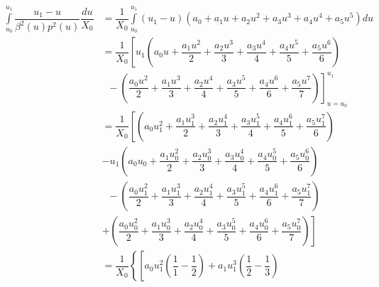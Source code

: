 \documentclass[a4paper,landscape]{article}
\begin{document}
\begin{align*}
    \int\limits_{u_0}^{u_1} \dfrac{u_1-u}{\beta^2(u) p^2(u)}\dfrac{du}{X_0} &= \dfrac{1}{X_0}\int\limits_{u_0}^{u_1}\left(u_1-u\right)\left(a_0 +a_1u + a_2u^2+a_3u^3+a_4u^4+a_5u^5\right)du\\
    &= \dfrac{1}{X_0}
    \left[
        u_1
        \left(
            a_0u + \dfrac{a_1u^2}{2} + \dfrac{a_2u^3}{3} + \dfrac{a_3u^4}{4} + \dfrac{a_4u^5}{5} + \dfrac{a_5u^6}{6}
        \right)
    \right.
    \\
    &
    \left.
        \;\; -
        \left(
            \dfrac{a_0u^2}{2} + \dfrac{a_1u^3}{3} + \dfrac{a_2u^4}{4} + \dfrac{a_3u^5}{5} + \dfrac{a_4u^6}{6} + \dfrac{a_5u^7}{7}
        \right)
    \right]_{u=u_0}^{u_1}
    \\
    &= \dfrac{1}{X_0}
    \left[
        \left(
            a_0u_1^2 + \dfrac{a_1u_1^3}{2} + \dfrac{a_2u_1^4}{3} + \dfrac{a_3u_1^5}{4} + \dfrac{a_4u_1^6}{5} + \dfrac{a_5u_1^7}{6}
        \right)
    \right.
    \\
    &
        -
        u_1
        \left(
            a_0u_0 + \dfrac{a_1u_0^2}{2} + \dfrac{a_2u_0^3}{3} + \dfrac{a_3u_0^4}{4} + \dfrac{a_4u_0^5}{5} + \dfrac{a_5u_0^6}{6}
        \right)
    \\
    &\;\;
        -
        \left(
            \dfrac{a_0u_1^2}{2} + \dfrac{a_1u_1^3}{3} + \dfrac{a_2u_1^4}{4} + \dfrac{a_3u_1^5}{5} + \dfrac{a_4u_1^6}{6} + \dfrac{a_5u_1^7}{7}
        \right)
    \\
    &
    \left.
    +
        \left(
            \dfrac{a_0u_0^2}{2} + \dfrac{a_1u_0^3}{3} + \dfrac{a_2u_0^4}{4} + \dfrac{a_3u_0^5}{5} + \dfrac{a_4u_0^6}{6} + \dfrac{a_5u_0^7}{7}
        \right)
    \right]
    \\
    &= \dfrac{1}{X_0}
    \left\{
        \left[
              a_0u_1^2\left(\dfrac{1}{1}- \dfrac{1}{2}\right)
            + a_1u_1^3\left(\dfrac{1}{2} - \dfrac{1}{3}\right)

\end{align*}
\end{document}
